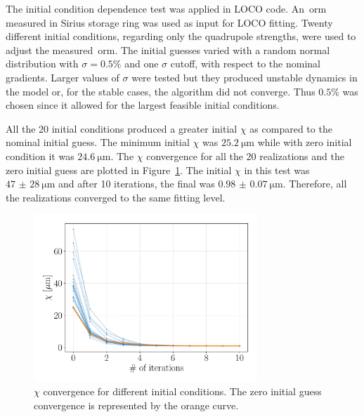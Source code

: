 The initial condition dependence test was applied in LOCO code. An~\gls{orm} measured in Sirius storage ring was used as input for LOCO fitting. Twenty different initial conditions, regarding only the quadrupole strengths, were used to adjust the measured~\gls{orm}. The initial guesses varied with a random normal distribution with $\sigma=0.5\%$ and one $\sigma$ cutoff, with respect to the nominal gradients. Larger values of $\sigma$ were tested but they produced unstable dynamics in the model or, for the stable cases, the algorithm did not converge. Thus $0.5\%$ was chosen since it allowed for the largest feasible initial conditions.

All the 20 initial conditions produced a greater initial $\chi$ as compared to the nominal initial guess. The minimum initial $\chi$ was $\SI{25.2}{\micro\meter}$ while with zero initial condition it was $\SI{24.6}{\micro\meter}$. The $\chi$ convergence for all the 20 realizations and the zero initial guess are plotted in Figure~\ref{fig:chi_ini_guess}. The initial $\chi$ in this test was $\SI{47(28)}{\micro\meter}$ and after 10 iterations, the final was $\SI{0.98(7)}{\micro\meter}$. Therefore, all the realizations converged to the same fitting level.
\begin{figure}
\centering
\includegraphics[width=0.75\textwidth]{figures/chi_convergence_initial_guess.pdf}
\caption{$\chi$ convergence for different initial conditions. The zero initial guess convergence is represented by the orange curve.}
\label{fig:chi_ini_guess}
\end{figure}

